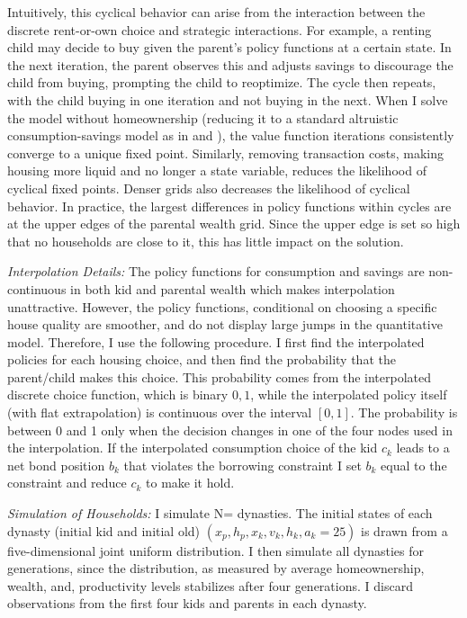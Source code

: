 \documentclass[12pt]{article}
\begin{document}
Intuitively, this cyclical behavior can arise from the interaction between the discrete rent-or-own choice and strategic interactions. For example, a renting child may decide to buy given the parent’s policy functions at a certain state. In the next iteration, the parent observes this and adjusts savings to discourage the child from buying, prompting the child to reoptimize. The cycle then repeats, with the child buying in one iteration and not buying in the next. When I solve the model without homeownership (reducing it to a standard altruistic consumption-savings model as in \cite{Barczyk2020a} and \cite{Chu2020}), the value function iterations consistently converge to a unique fixed point. Similarly, removing transaction costs, making housing more liquid and no longer a state variable, reduces the likelihood of cyclical fixed points. Denser grids also decreases the likelihood of cyclical behavior. In practice, the largest differences in policy functions within cycles are at the upper edges of the parental wealth grid. Since the upper edge is set so high that no households are close to it, this has little impact on the solution.

\textit{Interpolation Details:} The policy functions for consumption and savings are non-continuous in both kid and parental wealth which makes interpolation unattractive. However, the policy functions, conditional on choosing a specific house quality are smoother, and do not display large jumps in the quantitative model. Therefore, I use the following procedure. I first find the interpolated policies for each housing choice, and then find the probability that the parent/child makes this choice. This probability comes from the interpolated discrete choice function, which is binary ${0,1}$, while the interpolated policy itself (with flat extrapolation) is continuous over the interval $[0,1]$. The probability is between 0 and 1 only when the decision changes in one of the four nodes used in the interpolation. If the interpolated consumption choice of the kid $c_k$ leads to a net bond position $b_k$ that violates the borrowing constraint I set $b_k$ equal to the constraint and reduce $c_k$ to make it hold. 


\textit{Simulation of Households:} 
I simulate N={\parNdyn} dynasties. The initial states of each dynasty (initial kid and initial old) $(x_p,h_p,x_k,v_k,h_k,a_k=25)$ is drawn from a five-dimensional joint uniform distribution. I then simulate all dynasties for {\parNdyn} generations, since the distribution, as measured by average homeownership, wealth, and, productivity levels stabilizes after four generations. I discard observations from the first four kids and parents in each dynasty.
\end{document}
